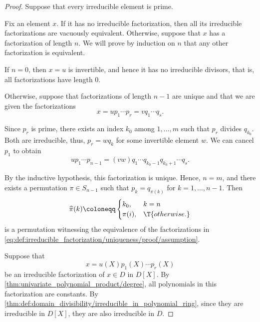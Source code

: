\begin{proof}
   Suppose that every irreducible element is prime.

  Fix an element \( x \). If it has no irreducible factorization, then all its irreducible factorizations are vacuously equivalent. Otherwise, suppose that \( x \) has a factorization of length \( n \). We will prove by induction on \( n \) that any other factorization is equivalent.

  If \( n = 0 \), then \( x = u \) is invertible, and hence it has no irreducible divisors, that is, all factorizations have length \( 0 \).

  Otherwise, suppose that factorizations of length \( n - 1 \) are unique and that we are given the factorizations
  \begin{equation}\label{eq:def:irreducible_factorization/uniqueness/proof/assumption}
    x = u p_1 \cdots p_r = v q_1 \cdots q_s.
  \end{equation}

  Since \( p_r \) is prime, there exists an index \( k_0 \) among \( 1, \ldots, m \) such that \( p_r \) divides \( q_{k_0} \). Both are irreducible, thus, \( p_r = w q_k \) for some invertible element \( w \). We can cancel \( p_1 \) to obtain
  \begin{equation*}
    u p_1 \cdots p_{n-1} = (vw) q_1 \cdots q_{k_0-1} q_{k_0+1} \cdots q_s.
  \end{equation*}

  By the inductive hypothesis, this factorization is unique. Hence, \( n = m \), and there exists a permutation \( \pi \in S_{n-1} \) such that \( p_k = q_{\pi(k)} \) for \( k = 1, \ldots, n - 1 \). Then
  \begin{equation*}
    \widehat{\pi}(k) \coloneqq \begin{cases}
      k_0,    & k = n \\
      \pi(i), & \T{otherwise.}
    \end{cases}
  \end{equation*}
  is a permutation witnessing the equivalence of the factorizations in \eqref{eq:def:irreducible_factorization/uniqueness/proof/assumption}.


  \SufficiencySubProof* Suppose that
  \begin{equation}\label{eq:thm:def:irreducible_factorization/polynomial_ring/sufficiency_assumption}
    x = u(X) p_1(X) \cdots p_r(X)
  \end{equation}
  be an irreducible factorization of \( x \in D \) in \( D[X] \). By \cref{thm:univariate_polynomial_product/degree}, all polynomials in this factorization are constants. By \cref{thm:def:domain_divisibility/irreducible_in_polynomial_ring}, since they are irreducible in \( D[X] \), they are also irreducible in \( D \).


\end{proof}
